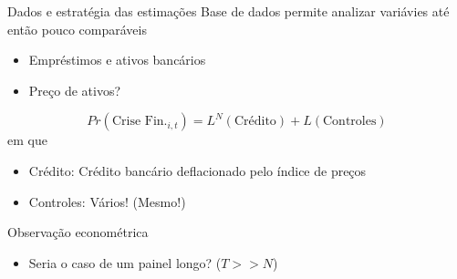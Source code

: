 \documentclass[presentation]{beamer}
\begin{document}
\begin{frame}[label={sec:org8571091}]{Dados e estratégia das estimações}
Base de dados permite analizar variávies até então pouco comparáveis

\begin{itemize}
\item Empréstimos e ativos bancários
\item Preço de ativos? \cite{jordaGreatMortgagingHousing2016}
\end{itemize}


$$
Pr(\text{Crise Fin.}_{i,t}) = L^{N}(\text{Crédito}) + L(\text{Controles})
$$
em que
\begin{itemize}
\item \alert{Crédito:} Crédito bancário deflacionado pelo índice de preços
\item \alert{Controles:} Vários! (Mesmo!)
\end{itemize}

\begin{block}{Observação econométrica}
\begin{itemize}
\item Seria o caso de um painel longo? (\(T>>N\))
\end{itemize}
\end{block}
\end{frame}
\end{document}
